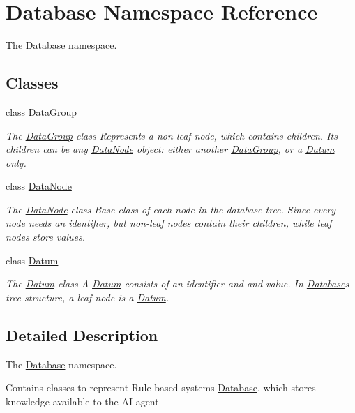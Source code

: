 \hypertarget{namespaceDatabase}{}\section{Database Namespace Reference}
\label{namespaceDatabase}


The \hyperlink{namespaceDatabase}{Database} namespace.  


\subsection*{Classes}
\begin{DoxyCompactItemize}
\item 
class \hyperlink{classDatabase_1_1DataGroup}{Data\+Group}
\begin{DoxyCompactList}\small\item\em The \hyperlink{classDatabase_1_1DataGroup}{Data\+Group} class Represents a non-\/leaf node, which contains children. Its children can be any \hyperlink{classDatabase_1_1DataNode}{Data\+Node} object\+: either another \hyperlink{classDatabase_1_1DataGroup}{Data\+Group}, or a \hyperlink{classDatabase_1_1Datum}{Datum} only. \end{DoxyCompactList}\item 
class \hyperlink{classDatabase_1_1DataNode}{Data\+Node}
\begin{DoxyCompactList}\small\item\em The \hyperlink{classDatabase_1_1DataNode}{Data\+Node} class Base class of each node in the database tree. Since every node needs an identifier, but non-\/leaf nodes contain their children, while leaf nodes store values. \end{DoxyCompactList}\item 
class \hyperlink{classDatabase_1_1Datum}{Datum}
\begin{DoxyCompactList}\small\item\em The \hyperlink{classDatabase_1_1Datum}{Datum} class A \hyperlink{classDatabase_1_1Datum}{Datum} consists of an identifier and and value. In \hyperlink{namespaceDatabase}{Database}\textquotesingle{}s tree structure, a leaf node is a \hyperlink{classDatabase_1_1Datum}{Datum}. \end{DoxyCompactList}\end{DoxyCompactItemize}


\subsection{Detailed Description}
The \hyperlink{namespaceDatabase}{Database} namespace. 

Contains classes to represent Rule-\/based system\textquotesingle{}s \hyperlink{namespaceDatabase}{Database}, which stores knowledge available to the AI agent 
